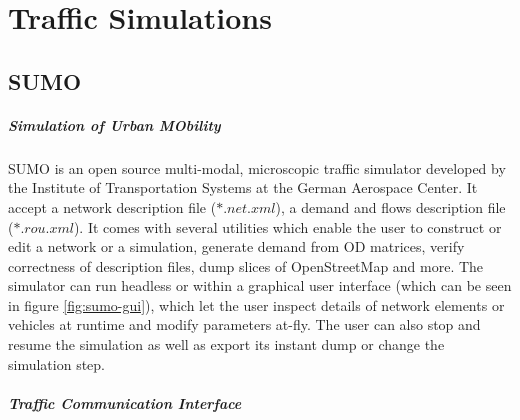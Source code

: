 \chapter{Traffic Simulations}

\section{SUMO}

\paragraph{\textbf{S}imulation of \textbf{U}rban \textbf{MO}bility}

SUMO \cite{krajzewicz2002sumo} is an open source multi-modal, microscopic traffic simulator developed by the Institute of Transportation Systems at the German Aerospace Center. It accept a network description file ($*.net.xml$), a demand and flows description file ($*.rou.xml$). It comes with several utilities which enable the user to construct or edit a network or a simulation, generate demand from OD matrices, verify correctness of description files, dump slices of OpenStreetMap and more. The simulator can run headless or within a graphical user interface (which can be seen in figure \ref{fig:sumo-gui}), which let the user inspect details of network elements or vehicles at runtime and modify parameters at-fly. The user can also stop and resume the simulation as well as export its instant dump or change the simulation step.


\paragraph{\textbf{T}raffic \textbf{C}ommunication \textbf{I}nterface}

